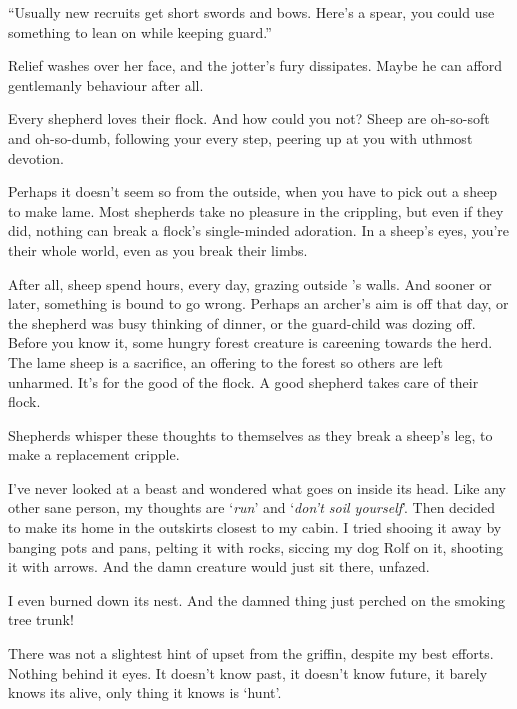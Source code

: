 \begin{multicols}{2}
\begin{exampletext}
  ``Usually new recruits get short swords and bows.
  Here's a spear, you could use something to lean on while keeping guard.''

  Relief washes over her face, and the \gls{jotter}'s fury dissipates.
  Maybe he can afford gentlemanly behaviour after all.
\end{exampletext}

\begin{exampletext}
  Every shepherd loves their flock.
  And how could you not?
  Sheep are oh-so-soft and oh-so-dumb, following your every step, peering up at you with uthmost devotion.

  Perhaps it doesn't seem so from the outside, when you have to pick out a sheep to make lame.
  Most shepherds take no pleasure in the crippling, but even if they did, nothing can break a flock's single-minded adoration.
  In a sheep's eyes, you're their whole world, even as you break their limbs.

  After all, sheep spend hours, every day, grazing outside 's walls.
  And sooner or later, something is bound to go wrong.
  Perhaps an archer's aim is off that day, or the shepherd was busy thinking of dinner, or the guard-child was dozing off.
  Before you know it, some hungry forest creature is careening towards the herd.
  The lame sheep is a sacrifice, an offering to the forest so others are left unharmed.
  It's for the good of the flock.
  A good shepherd takes care of their flock.

  Shepherds whisper these thoughts to themselves as they break a sheep's leg, to make a replacement cripple.
\end{exampletext}

\begin{exampletext}
  I've never looked at a beast and wondered what goes on inside its head.
  Like any other sane person, my thoughts are `\emph{run}' and `\emph{don't soil yourself}'.
  Then  decided to make its home in the outskirts closest to my cabin.
  I tried shooing it away by banging pots and pans, pelting it with rocks, siccing my dog Rolf on it, shooting it with arrows.
  And the damn creature would just sit there, unfazed.

  I even burned down its nest. And the damned thing just perched on the smoking tree trunk!

  There was not a slightest hint of upset from the \gls{griffin}, despite my best efforts.
  Nothing behind it eyes.
  It doesn't know past, it doesn't know future, it barely knows its alive, only thing it knows is `hunt'.


\end{exampletext}
\end{multicols}
